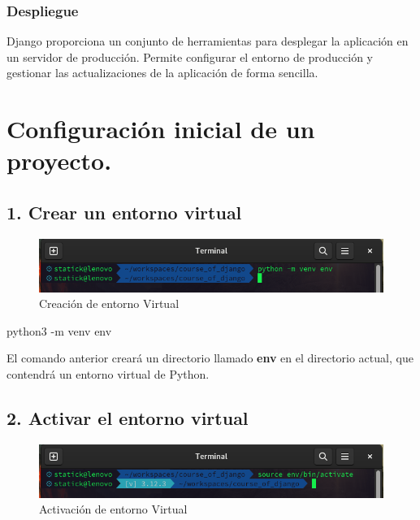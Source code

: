 \documentclass[
  a4paper,
  DIV=11,
  numbers=noendperiod,
  onepage,
  openany]{scrreprt}
\newenvironment{Shaded}{\begin{snugshade}}{\end{snugshade}}
\newcommand{\AttributeTok}[1]{\textcolor[rgb]{0.40,0.45,0.13}{#1}}
\newcommand{\ExtensionTok}[1]{\textcolor[rgb]{0.00,0.23,0.31}{#1}}
\newcommand{\NormalTok}[1]{\textcolor[rgb]{0.00,0.23,0.31}{#1}}
\begin{document}
\subsection{Despliegue}\label{despliegue}

Django proporciona un conjunto de herramientas para desplegar la
aplicación en un servidor de producción. Permite configurar el entorno
de producción y gestionar las actualizaciones de la aplicación de forma
sencilla.

\chapter{Configuración inicial de un
proyecto.}\label{configuraciuxf3n-inicial-de-un-proyecto.}

\section{1. Crear un entorno virtual}\label{crear-un-entorno-virtual-1}

\begin{figure}[H]

{\centering \includegraphics{images/creacion_entorno_virtual.png}

}

\caption{Creación de entorno Virtual}

\end{figure}%

\begin{Shaded}
\begin{Highlighting}[]
\ExtensionTok{python3} \AttributeTok{{-}m}\NormalTok{ venv env}
\end{Highlighting}
\end{Shaded}

El comando anterior creará un directorio llamado \textbf{env} en el
directorio actual, que contendrá un entorno virtual de Python.

\section{2. Activar el entorno
virtual}\label{activar-el-entorno-virtual}

\begin{figure}[H]

{\centering \includegraphics{images/activacion_entorno_virtual.png}

}

\caption{Activación de entorno Virtual}

\end{figure}%
\end{document}
